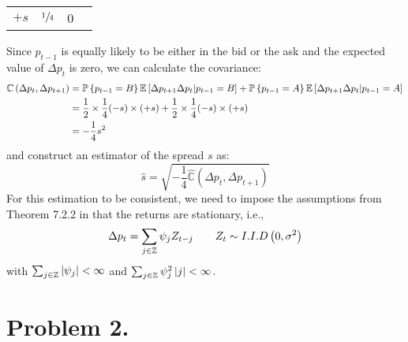 \documentclass[12pt,twoside]{article}
\begin{document}
\begin{solution}
\begin{table}[H]
\begin{tabular}{cccc}
             \multicolumn{1}{c|}{\(+s\)} & \multicolumn{1}{c|}{\(\sfrac{1}{4}\)} & \multicolumn{1}{c|}{0}  & \\ \cline{2-3} 
        \end{tabular}
        \endgroup
    \end{table}
    Since \(p_{t-1}\) is equally likely to be either in the bid or the ask and the expected value of \(\Delta p_t\) is zero, we can calculate the covariance:
    \begin{align*}
        \mathbb{C}\left(\Delta p_{t},\Delta p_{t+1} \right) & = \mathbb{P}\left\lbrace p_{t-1}=B \right\rbrace\mathbb{E}\left[\Delta p_{t+1}\Delta p_{t} \vert p_{t-1}=B\right] + \mathbb{P}\left\lbrace p_{t-1}=A \right\rbrace\mathbb{E}\left[\Delta p_{t+1}\Delta p_{t} \vert p_{t-1}=A\right] \\
        & = \frac{1}{2}\times\frac{1}{4}(-s)\times(+s) + \frac{1}{2}\times\frac{1}{4}(-s)\times(+s) \\ 
        & = -\frac{1}{4}s^2
    \end{align*}
    and construct an estimator of the spread \(s\) as:
    \[
        \widehat{s} = \sqrt{-\frac{1}{4}\widehat{\mathbb{C}}\left(\Delta p_{t},\Delta p_{t+1}\right)}
    \]
    For this estimation to be consistent, we need to impose the assumptions from Theorem 7.2.2 in \citet{brockwell2009time} that the returns are stationary, i.e., 
    \[
        \Delta p_{t} = \sum_{j \in \mathbb{Z}} \psi_j Z_{t-j} \qquad Z_t \sim I.I.D \left(0, \sigma^2\right)
    \]
    with \(\sum_{j \in \mathbb{Z}} |\psi_j| < \infty\) and \(\sum_{j \in \mathbb{Z}} \psi_j^2\left\lvert j\right\rvert < \infty\).
\end{solution}

\newpage

\section{Problem 2.}
\end{document}
